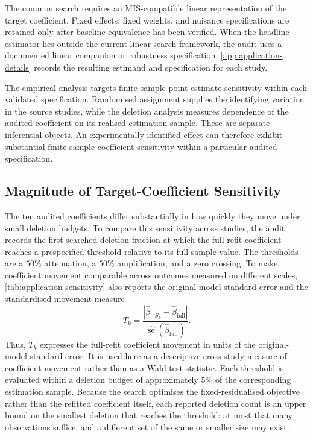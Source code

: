\documentclass[../main.tex]{subfiles}
\begin{document}
The common search requires an MIS-compatible linear representation of the target coefficient. Fixed effects, fixed weights, and nuisance specifications are retained only after baseline equivalence has been verified. When the headline estimator lies outside the current linear search framework, the audit uses a documented linear companion or robustness specification. \autoref{app:application-details} records the resulting estimand and specification for each study.

The empirical analysis targets finite-sample point-estimate sensitivity within each validated specification. Randomised assignment supplies the identifying variation in the source studies, while the deletion analysis measures dependence of the audited coefficient on its realised estimation sample. These are separate inferential objects. An experimentally identified effect can therefore exhibit substantial finite-sample coefficient sensitivity within a particular audited specification.

\FloatBarrier
\subsection{Magnitude of Target-Coefficient Sensitivity}
\label{subsec:application-sensitivity}

The ten audited coefficients differ substantially in how quickly they move under small deletion budgets. To compare this sensitivity across studies, the audit records the first searched deletion fraction at which the full-refit coefficient reaches a prespecified threshold relative to its full-sample value. The thresholds are a \(50\%\) attenuation, a \(50\%\) amplification, and a zero crossing. To make coefficient movement comparable across outcomes measured on different scales, \autoref{tab:application-sensitivity} also reports the original-model standard error and the standardised movement measure
\[
T_k = \frac{ \left| \widehat{\beta}_{-S_k} - \widehat{\beta}_{\mathrm{full}} \right|
}{
	\widehat{\operatorname{se}}
	\left(
	\widehat{\beta}_{\mathrm{full}}
	\right)
}.
\]
Thus, \(T_k\) expresses the full-refit coefficient movement in units of the original-model standard error. It is used here as a descriptive cross-study measure of coefficient movement rather than as a Wald test statistic. Each threshold is evaluated within a deletion budget of approximately \(5\%\) of the corresponding estimation sample. Because the search optimises the fixed-residualised objective rather than the refitted coefficient itself, each reported deletion count is an upper bound on the smallest deletion that reaches the threshold: at most that many observations suffice, and a different set of the same or smaller size may exist.
\end{document}
